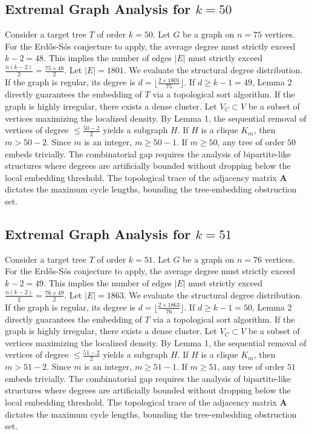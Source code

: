 \documentclass[11pt,a4paper]{article}
\begin{document}
\subsection{Extremal Graph Analysis for $k=50$}
Consider a target tree $T$ of order $k=50$.
Let $G$ be a graph on $n=75$ vertices.
For the Erd\H{o}s-S\'os conjecture to apply, the average degree must strictly exceed $k-2 = 48$.
This implies the number of edges $|E|$ must strictly exceed $\frac{n(k-2)}{2} = \frac{75 \times 48}{2}$.
Let $|E| = 1801$.
We evaluate the structural degree distribution. If the graph is regular, its degree is $d = \lfloor \frac{2 \times 1801}{75} \rfloor$.
If $d \geq k-1 = 49$, Lemma 2 directly guarantees the embedding of $T$ via a topological sort algorithm.
If the graph is highly irregular, there exists a dense cluster. Let $V_C \subset V$ be a subset of vertices maximizing the localized density.
By Lemma 1, the sequential removal of vertices of degree $\leq \frac{50-2}{2}$ yields a subgraph $H$.
If $H$ is a clique $K_{m}$, then $m > 50-2$. Since $m$ is an integer, $m \geq 50-1$. If $m \geq 50$, any tree of order $50$ embeds trivially.
The combinatorial gap requires the analysis of bipartite-like structures where degrees are artificially bounded without dropping below the local embedding threshold. The topological trace of the adjacency matrix $\mathbf{A}$ dictates the maximum cycle lengths, bounding the tree-embedding obstruction set.


\subsection{Extremal Graph Analysis for $k=51$}
Consider a target tree $T$ of order $k=51$.
Let $G$ be a graph on $n=76$ vertices.
For the Erd\H{o}s-S\'os conjecture to apply, the average degree must strictly exceed $k-2 = 49$.
This implies the number of edges $|E|$ must strictly exceed $\frac{n(k-2)}{2} = \frac{76 \times 49}{2}$.
Let $|E| = 1863$.
We evaluate the structural degree distribution. If the graph is regular, its degree is $d = \lfloor \frac{2 \times 1863}{76} \rfloor$.
If $d \geq k-1 = 50$, Lemma 2 directly guarantees the embedding of $T$ via a topological sort algorithm.
If the graph is highly irregular, there exists a dense cluster. Let $V_C \subset V$ be a subset of vertices maximizing the localized density.
By Lemma 1, the sequential removal of vertices of degree $\leq \frac{51-2}{2}$ yields a subgraph $H$.
If $H$ is a clique $K_{m}$, then $m > 51-2$. Since $m$ is an integer, $m \geq 51-1$. If $m \geq 51$, any tree of order $51$ embeds trivially.
The combinatorial gap requires the analysis of bipartite-like structures where degrees are artificially bounded without dropping below the local embedding threshold. The topological trace of the adjacency matrix $\mathbf{A}$ dictates the maximum cycle lengths, bounding the tree-embedding obstruction set.
\end{document}
